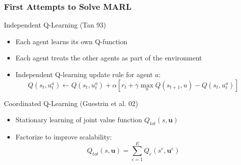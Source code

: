 \documentclass{beamer}
\begin{document}
    \begin{frame}
        \frametitle{First Attempts to Solve MARL}

        \begin{block}{Independent Q-Learning (Tan 93)}
            \begin{itemize}
                \item Each agent learns its own Q-function
                \item Each agent treats the other agents as part of the environment
                \item Independent Q-learning update rule for agent $a$:
                $$
                Q\left(s_{t}, u_{t}^{a}\right) \leftarrow Q\left(s_{t}, u_{t}^{a}\right)+\alpha\left[r_{t}+\gamma \max _{u} Q\left(s_{t+1}, u\right)-Q\left(s_{t}, u_{t}^{a}\right)\right]
                $$
                
            \end{itemize}

        \end{block}

        \begin{block}{Coordinated Q-Learning (Guestrin et al. 02)}
            \begin{itemize}
                \item Stationary learning of joint value function 
                $Q_{t o t}(s, \mathbf{u})$
                \item Factorize to improve scalability:
                $$
                Q_{t o t}(s, \mathbf{u})=\sum_{e=1}^{E} Q_{e}\left(s^{e}, \mathbf{u}^{e}\right)
                $$

            \end{itemize}
        \end{block}

    \end{frame}



























\end{document}
